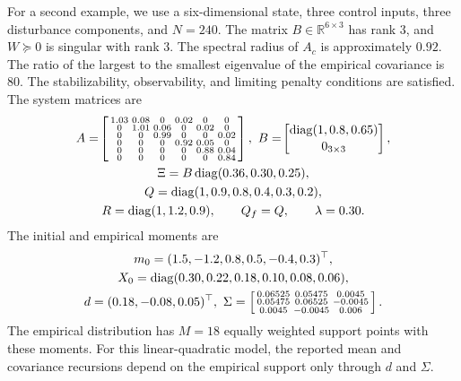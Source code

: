\documentclass[10pt,journal,twoside]{IEEEtran}
\theoremstyle{definition}
\theoremstyle{remark}
\newcommand{\diag}{\operatorname{diag}}
\begin{document}
For a second example, we use a six-dimensional state, three control inputs, three disturbance components, and \(N=240\). The matrix \(B\in\mathbb R^{6\times3}\) has rank \(3\), and \(W\succeq0\) is singular
with rank \(3\). The spectral radius of \(A_c\) is approximately \(0.92\).
The ratio of the largest to the smallest eigenvalue of the empirical
covariance is \(80\). The stabilizability, observability, and limiting penalty
conditions are satisfied. The system matrices are
\begin{equation*}
\setlength{\arraycolsep}{1.8pt}
\begin{gathered}
A=
\!\left[\begin{smallmatrix}
1.03 & 0.08 & 0    & 0.02 & 0    & 0\\
0    & 1.01 & 0.06 & 0    & 0.02 & 0\\
0    & 0    & 0.99 & 0    & 0    & 0.02\\
0    & 0    & 0    & 0.92 & 0.05 & 0\\
0    & 0    & 0    & 0    & 0.88 & 0.04\\
0    & 0    & 0    & 0    & 0    & 0.84
\end{smallmatrix}\right],
~B=\!
\left[\begin{matrix}
\diag(1,0.8,0.65)\\[1pt]
0_{3\times3}
\end{matrix}\right],\\
\Xi=B\diag(0.36,0.30,0.25),\\
Q=\diag(1,0.9,0.8,0.4,0.3,0.2),\\
R=\diag(1,1.2,0.9),\qquad
Q_f=Q,\qquad \lambda=0.30.
\end{gathered}
\end{equation*}
The initial and empirical moments are
\begin{equation*}
\setlength{\arraycolsep}{2pt}
\begin{gathered}
m_0=(1.5,-1.2,0.8,0.5,-0.4,0.3)^\top,\\
X_0=\diag(0.30,0.22,0.18,0.10,0.08,0.06),\\
d=(0.18,-0.08,0.05)^\top,
~\Sigma=
\left[\begin{smallmatrix}
 0.06525 &  0.05475 &  0.0045\\
 0.05475 &  0.06525 & -0.0045\\
 0.0045  & -0.0045  &  0.006
\end{smallmatrix}\right].
\end{gathered}
\end{equation*}
The empirical distribution has \(M=18\) equally weighted support points with
these moments. For this linear-quadratic model, the reported mean and
covariance recursions depend on the empirical support only through \(d\) and
\(\Sigma\).
\end{document}
